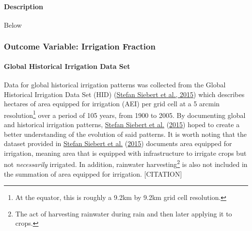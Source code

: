 \documentclass[12pt,twoside]{reedthesis}
\begin{document}
\hypertarget{precipdesc}{%
\paragraph{Description}\label{precipdesc}}

Below

\hypertarget{irrfrac}{%
\subsubsection{Outcome Variable: Irrigation Fraction}\label{irrfrac}}

\hypertarget{HID}{%
\paragraph{Global Historical Irrigation Data Set}\label{HID}}

Data for global historical irrigation patterns was collected from the Global Historical Irrigation Data Set (HID) (\protect\hyperlink{ref-siebertGlobalDataSet2015}{Stefan Siebert et al., 2015}) which describes hectares of area equipped for irrigation (AEI) per grid cell at a 5 arcmin resolution\footnote{At the equator, this is roughly a 9.2km by 9.2km grid cell resolution.} over a period of 105 years, from 1900 to 2005. By documenting global and historical irrigation patterns, \protect\hyperlink{ref-siebertGlobalDataSet2015}{Stefan Siebert et al.} (\protect\hyperlink{ref-siebertGlobalDataSet2015}{2015}) hoped to create a better understanding of the evolution of said patterns. It is worth noting that the dataset provided in \protect\hyperlink{ref-siebertGlobalDataSet2015}{Stefan Siebert et al.} (\protect\hyperlink{ref-siebertGlobalDataSet2015}{2015}) documents area equipped for irrigation, meaning area that is equipped with infrastructure to irrigate crops but not \emph{necessarily} irrigated. In addition, rainwater harvesting\footnote{The act of harvesting rainwater during rain and then later applying it to crops.} is also not included in the summation of area equipped for irrigation. {[}CITATION{]}
\end{document}
